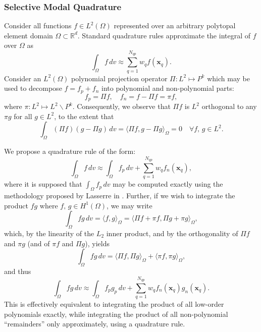 	\subsubsection*{Selective Modal Quadrature}
	
	Consider all functions $f \in L^2 (\Omega)$ represented over an arbitrary polytopal element domain $\Omega \subset \mathbb{R}^d$. Standard quadrature rules approximate the integral of $f$ over $\Omega$ as
	\begin{equation}
		\int_\Omega f \, dv \approx \sum_{q=1}^{N_{qp}} w_q f(\mathbf{x}_q).
	\end{equation}
	Consider an $L^2 (\Omega)$ polynomial projection operator $\Pi : L^2 \mapsto P^k$ which may be used to decompose $f = f_p + f_n$ into polynomial and non-polynomial parts:
	\begin{equation}
		f_p = \Pi f, \quad f_n = f - \Pi f = \pi f,
	\end{equation}
	where $\pi : L^2 \mapsto L^2 \backslash P^k$. Consequently, we observe that $\Pi f$ is $L^2$ orthogonal to any $\pi g$ for all $g \in L^2$, to the extent that
	\begin{equation}
		\int_{\Omega} (\Pi f) (g - \Pi g) \, dv = \langle \Pi f, g - \Pi g \rangle_{\Omega} = 0 \quad \forall f, \, g \in L^2.
	\end{equation}
	
	We propose a quadrature rule of the form:
	\begin{equation}
		\int_\Omega f \, dv \approx \int_\Omega f_p \, dv + \sum_{q=1}^{N_{qp}} w_q f_n(\mathbf{x}_q),
	\end{equation}
	where it is supposed that $\int_\Omega f_p \, dv$ may be computed exactly using the methodology proposed by Lasserre in \cite{Chin:15}. Further, if we wish to integrate the product $f g$ where $f, \, g \in H^1 (\Omega)$, we may write
	\begin{equation}
		\int_\Omega f g \, dv = \langle f, g \rangle_{\Omega} = \langle \Pi f + \pi f, \Pi g + \pi  g \rangle_{\Omega},
	\end{equation}
	which, by the linearity of the $L_2$ inner product, and by the orthogonality of $\Pi f$ and $\pi g$ (and of $\pi f$ and $\Pi g$), yields
	\begin{equation}
		\int_\Omega f g \, dv = \langle \Pi f, \Pi g \rangle_{\Omega} + \langle \pi f, \pi g \rangle_{\Omega},
	\end{equation}
	and thus
	\begin{equation}
		\int_\Omega f g \, dv \approx \int_\Omega f_p g_p \, dv + \sum_{q=1}^{N_{qp}} w_q f_n(\mathbf{x}_q) g_n(\mathbf{x}_q).
	\end{equation}
	This is effectively equivalent to integrating the product of all low-order polynomials exactly, while integrating the product of all non-polynomial ``remainders'' only approximately, using a quadrature rule.
	
